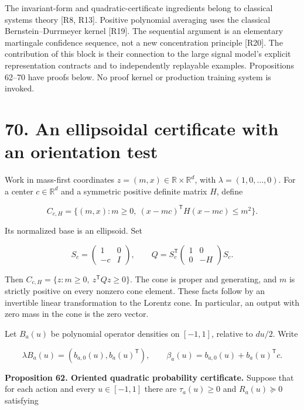 \documentclass[11pt,letterpaper]{article}
\begin{document}
The invariant-form and quadratic-certificate ingredients belong to
classical systems theory {[}R8, R13{]}. Positive polynomial averaging
uses the classical Bernstein--Durrmeyer kernel {[}R19{]}. The sequential
argument is an elementary martingale confidence sequence, not a new
concentration principle {[}R20{]}. The contribution of this block is
their connection to the large signal model's explicit representation
contracts and to independently replayable examples. Propositions 62--70
have proofs below. No proof kernel or production training system is
invoked.

\section{70. An ellipsoidal certificate with an orientation
test}\label{an-ellipsoidal-certificate-with-an-orientation-test}

Work in mass-first coordinates \(z=(m,x)\in\mathbb R\times\mathbb R^d\),
with \(\lambda=(1,0,\ldots,0)\). For a center \(c\in\mathbb R^d\) and a
symmetric positive definite matrix \(H\), define

\[
C_{c,H}=\{(m,x):m\geq0,\ (x-mc)^{\mathsf T}H(x-mc)\leq m^2\}.
\]

Its normalized base is an ellipsoid. Set

\[
S_c=\begin{pmatrix}1&0\\-c&I\end{pmatrix},\qquad
Q=S_c^{\mathsf T}\begin{pmatrix}1&0\\0&-H\end{pmatrix}S_c.
\]

Then \(C_{c,H}=\{z:m\geq0,\ z^{\mathsf T}Qz\geq0\}\). The cone is proper
and generating, and \(m\) is strictly positive on every nonzero cone
element. These facts follow by an invertible linear transformation to
the Lorentz cone. In particular, an output with zero mass in the cone is
the zero vector.

Let \(B_a(u)\) be polynomial operator densities on \([-1,1]\), relative
to \(du/2\). Write

\[
\lambda B_a(u)=(b_{a,0}(u),b_a(u)^{\mathsf T}),\qquad
\beta_a(u)=b_{a,0}(u)+b_a(u)^{\mathsf T}c.
\]

\textbf{Proposition 62. Oriented quadratic probability certificate.}
Suppose that for each action and every \(u\in[-1,1]\) there are
\(\tau_a(u)\geq0\) and \(R_a(u)\succeq0\) satisfying
\end{document}

